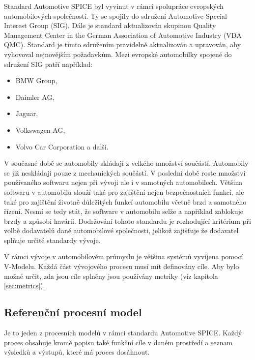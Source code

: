 \documentclass[czech,master,public,dept460,male,cpdeclaration,oneside]{diploma}
\begin{document}
Standard Automotive SPICE byl vyvinut v rámci spolupráce evropských automobilových společností. Ty se spojily do sdružení Automotive Special Interest Group (SIG). Dále je standard aktualizován skupinou Quality Management Center in the German Association of Automotive Industry (VDA QMC). Standard je tímto sdružením pravidelně aktualizován a upravován, aby vyhovoval nejnovějším požadavkům. Mezi evropské automobilky spojené do sdružení SIG patří například:

\begin{itemize}
  \item BMW Group,
  \item Daimler AG,
  \item Jaguar,
  \item Volkswagen AG,
  \item Volvo Car Corporation a další.
\end{itemize}

V současné době se automobily skládají z velkého množství součástí. Automobily se již neskládají pouze z mechanických součástí. V poslední době roste množství používaného softwaru nejen při vývoji ale i v samotných automobilech. Většina softwaru v automobilu slouží také pro zajištění nejen bezpečnostních funkcí, ale také pro zajištění životně důležitých funkcí automobilu včetně brzd a samotného řízení. Nesmí se tedy stát, že software v automobilu selže a například zablokuje brzdy a způsobí havárii. Dodržování tohoto standardu je rozhodující kritérium při volbě dodavatelů dané automobilové společnosti, jelikož zajišťuje že dodavatel splňuje určité standardy vývoje.

V rámci vývoje v automobilovém průmyslu je většina systémů vyvíjena pomocí V-Modelu. Každá část  vývojového procesu musí mít definovány cíle. Aby bylo možné určit, zda jsou cíle splněny jsou používány metriky (viz kapitola \ref{sec:metrics}). 

\subsection{Referenční procesní model}
Je to jeden z procesních modelů v rámci standardu Automotive SPICE. 
Každý proces obsahuje kromě popisu také funkční cíle v daném prostředí a seznam výsledků a výstupů, které má proces dosáhnout.
\cite{ref:aspice_download_procesni_modely}
\end{document}
